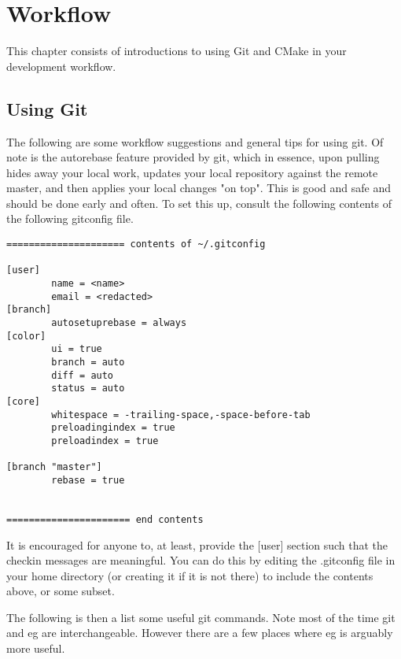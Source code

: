 \documentclass[pdf,12pt,report,strict]{SANDreport}
\theoremstyle{remark}
\begin{document}
\chapter{Workflow}
\label{workflow}

This chapter consists of introductions to using Git and CMake in your
development workflow.

\section{Using Git}

The following are some workflow suggestions and general tips for using
git. Of note is the autorebase feature provided by git, which in
essence, upon pulling hides away your local work, updates your local
repository against the remote master, and then applies your local
changes "on top". This is good and safe and should be done early and
often. To set this up, consult the following contents of the following
gitconfig file.

\begin{verbatim}
===================== contents of ~/.gitconfig

[user]
        name = <name>
        email = <redacted>
[branch]
        autosetuprebase = always
[color]
        ui = true
        branch = auto
        diff = auto
        status = auto
[core]
        whitespace = -trailing-space,-space-before-tab
        preloadingindex = true
        preloadindex = true

[branch "master"]
        rebase = true


====================== end contents
\end{verbatim}

It is encouraged for anyone to, at least, provide the [user] section
such that the checkin messages are meaningful. You can do this by
editing the .gitconfig file in your home directory (or creating it if
it is not there) to include the contents above, or some subset.

The following is then a list some useful git commands. Note most of
the time git and eg are interchangeable. However there are a few
places where eg is arguably more useful.
\end{document}
